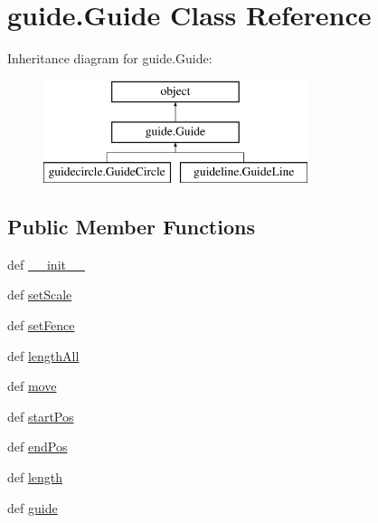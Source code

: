 \hypertarget{classguide_1_1Guide}{}\section{guide.\+Guide Class Reference}
\label{classguide_1_1Guide}
Inheritance diagram for guide.\+Guide\+:\begin{figure}[H]
\begin{center}
\leavevmode
\includegraphics[height=3.000000cm]{classguide_1_1Guide}
\end{center}
\end{figure}
\subsection*{Public Member Functions}
\begin{DoxyCompactItemize}
\item 
def \hyperlink{classguide_1_1Guide_aad9d830db042d95ca02111ec55d2b004}{\+\_\+\+\_\+init\+\_\+\+\_\+}
\item 
def \hyperlink{classguide_1_1Guide_a609b053c8850f6a7f10baaf30c55149a}{set\+Scale}
\item 
def \hyperlink{classguide_1_1Guide_ab01574471f3634cea5a3fbd4a66eed2b}{set\+Fence}
\item 
def \hyperlink{classguide_1_1Guide_ae3b0119960ebbfe29dd6bafd84c9ae0a}{length\+All}
\item 
def \hyperlink{classguide_1_1Guide_a1792236203d0607ab14b9150dd0e97e5}{move}
\item 
def \hyperlink{classguide_1_1Guide_a88ee97de87ef2ea8f80935a891585993}{start\+Pos}
\item 
def \hyperlink{classguide_1_1Guide_ad00fc3d51175ff0f514712ec78bfba73}{end\+Pos}
\item 
def \hyperlink{classguide_1_1Guide_a740a12b254d61d915aa83432403580f7}{length}
\item 
def \hyperlink{classguide_1_1Guide_ae44ee9ec8c0c21cb2fbe17cd9114808c}{guide}
\end{DoxyCompactItemize}
